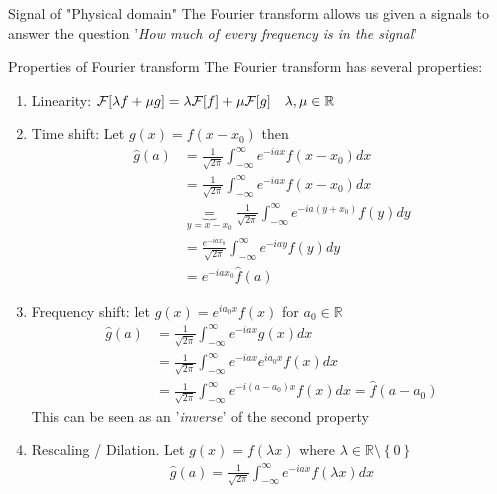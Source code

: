 \begin{parag}{Signal of "Physical domain"}
    The Fourier transform allows us given a signals to answer the question '\textit{How much of every frequency is in the signal}' 
\end{parag}


\begin{parag}{Properties of Fourier transform}
	The Fourier transform has several properties:
	\begin{enumerate}
	    \item Linearity: $\mathcal{F}\left[\lambda f + \mu g\right] =  \lambda \mathcal{F}\left[f\right] + \mu \mathcal{F}\left[g\right] \mathspace \lambda, \mu \in \mathbb{R}$ 
	    \item Time shift: Let $g\left(x\right) = f\left(x - x_0\right)$ then 
			\begin{align*} 
				\hat{g}\left(a\right) &=  \frac{1}{\sqrt{2\pi}}\int_{-\infty}^{\infty} e^{-iax}f\left(x - x_0\right)dx \\
				&= \frac{1}{\sqrt{2\pi}}\int_{-\infty}^{\infty}e^{-iax}f\left(x - x_0\right)dx \\
				&\underbrace{=}_{y = x - x_0} \frac{1}{\sqrt{2\pi}}\int_{-\infty}^{\infty}e^{-ia\left(y + x_0\right)}f\left(y\right)dy\\
				&= \frac{e^{-iax_0}}{\sqrt{2\pi}}\int_{-\infty}^{\infty}e^{-iay}f\left(y\right)dy\\
				&= e^{-iax_0} \hat{f}\left(a\right)
			\end{align*}
		\item Frequency shift: let $g\left(x\right) =  e^{ia_0x}f\left(x\right)$ for $a_0 \in \mathbb{R}$ 
			\begin{align*} 
				\hat{g}\left(a\right) &=  \frac{1}{\sqrt{2\pi}} \int_{-\infty}^{\infty}e^{-iax}g\left(x\right)dx\\
				&= \frac{1}{\sqrt{2\pi}}\int_{-\infty}^{\infty}e^{-iax}e^{ia_0x}f\left(x\right)dx \\
				&=  \frac{1}{\sqrt{2\pi}} \int_{-\infty}^{\infty} e^{-i\left(a - a_0\right)x}f\left(x\right)dx =  \hat{f}\left(a - a_0\right)
			\end{align*}
			This can be seen as an '\textit{inverse}' of the second property
		\item Rescaling / Dilation. Let $g\left(x\right) = f\left(\lambda x\right)$ where $\lambda \in \mathbb{R}\setminus \left\{0\right\}$
			\begin{align*} 
				\hat{g}\left(a\right) = \frac{1}{\sqrt{2\pi}} \int_{-\infty}^{\infty}e^{-iax}f\left(\lambda x\right)dx

\end{align*}
\end{enumerate}
\end{parag}
